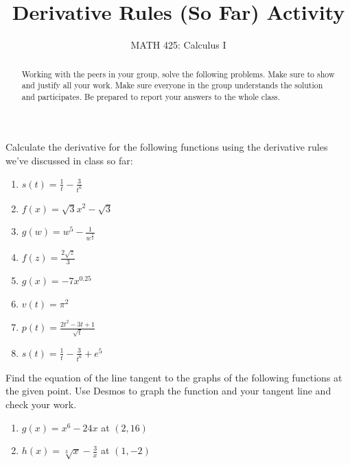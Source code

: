 \documentclass{ximera}
\title{Derivative Rules (So Far) Activity}
\author{MATH 425: Calculus I}
\begin{document}
\begin{abstract}
    Working with the peers in your group, solve the following problems. Make sure to show and justify all your work. Make sure everyone in the group understands the solution and participates. Be prepared to report your answers to the whole class. 
\end{abstract}
\maketitle


\begin{exercise}
Calculate the derivative for the following functions using the derivative rules we've discussed in class so far: 
\begin{enumerate}
    \item $s(t)=\frac{1}{t}-\frac{3}{t^6}$
    \item $f(x)=\sqrt{3}x^2-\sqrt{3}$
    \item $g(w)=w^5-\frac{1}{w^\frac{3}{2}}$
    \item $f(z)=\frac{2\sqrt{z}}{3}$
    \item $g(x)=-7x^{0.25}$
    \item $v(t)=\pi^2$
    \item $p(t)=\frac{2t^2-3t+1}{\sqrt{t}}$
    \item $s(t)=\frac{1}{t}-\frac{3}{t^6}+e^5$
    
\end{enumerate}
\end{exercise}

\begin{exercise}
    Find the equation of the line tangent to the graphs of the following functions at the given point.  Use Desmos to graph the function and your tangent line and check your work.
        \begin{enumerate}
            \item $g(x)=x^6-24x$ at $(2, 16)$\\
            \item $h(x)=\sqrt[3]{x}-\frac{3}{x}$ at $(1, -2)$\\
        \end{enumerate}
\end{exercise}
\end{document}
